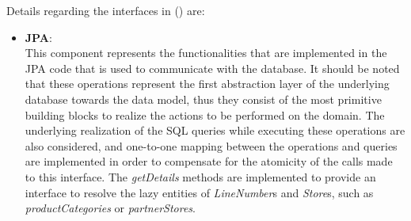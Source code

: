 Details regarding the interfaces in () are:
\begin{itemize}
    \item \textbf{JPA}: \\
    This component represents the functionalities that are implemented in the JPA code that is used to communicate with the database.
    It should be noted that these operations represent the first abstraction layer of the underlying database towards the data model, thus they consist of the most primitive building blocks to realize the actions to be performed on the domain.
    The underlying realization of the SQL queries while executing these operations are also considered, and one-to-one mapping between the operations and queries are implemented in order to compensate for the atomicity of the calls made to this interface.
    The \textit{getDetails} methods are implemented to provide an interface to resolve the lazy entities of \textit{LineNumber}s and \textit{Store}s, such as \textit{productCategories} or \textit{partnerStores}.


\end{itemize}
